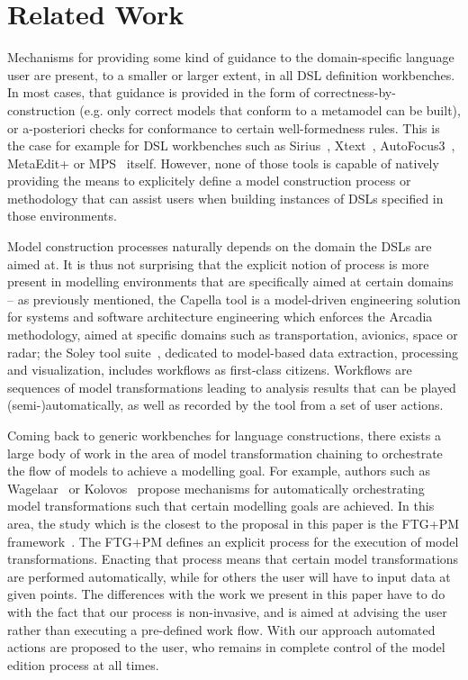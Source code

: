 \section{Related Work}
\label{sec:related_work}
 \vspace{-.3cm}
Mechanisms for providing some kind of guidance to the domain-specific
language user are present, to a smaller or larger extent, in all DSL definition
workbenches. In most cases, that guidance is provided in the form of
correctness-by-construction (e.g. only correct models that conform to a
metamodel can be built), or a-posteriori checks for conformance to certain
well-formedness rules. This is the case for example for DSL workbenches such as
Sirius~\cite{DBLP:conf/asplos/HauswaldLZLRKDM15},
Xtext~\cite{DBLP:conf/oopsla/EysholdtB10}, AutoFocus3~\cite{AF315},
MetaEdit+\cite{DBLP:conf/sle/Tolvanen16} or MPS~\cite{DBLP:conf/pppj/PechSV13}
itself. However, none of those tools is capable of natively providing the means
to explicitely define a model construction process or methodology that can
assist users when building instances of DSLs specified in those environments.

Model construction processes naturally depends on the domain the DSLs are aimed
at. It is thus not surprising that the explicit notion of process is more
present in modelling environments that are specifically aimed at certain domains
-- as previously mentioned, the Capella tool is a model-driven engineering
solution for systems and software architecture engineering which enforces the
Arcadia~\cite{DBLP:conf/syscon/BonnetVEN16} methodology, aimed at specific
domains such as transportation, avionics, space or radar; the Soley tool
suite~\cite{soley}, dedicated to model-based data extraction, processing and
visualization, includes workflows as first-class citizens.
Workflows are sequences of model transformations leading to analysis results
that can be played (semi-)automatically, as well as recorded by the tool from a
set of user actions.

Coming back to generic workbenches for language constructions, there exists a
large body of work in the area of model transformation chaining to orchestrate
the flow of models to achieve a modelling goal. For example, authors such as
Wagelaar~\cite{wagelaar2006blackbox}  or Kolovos~\cite{Kolovos2008} propose
mechanisms for automatically orchestrating model transformations such that
certain modelling goals are achieved. In this area, the study which is the
closest to the proposal in this paper is the FTG+PM
framework~\cite{DBLP:conf/sdl/LucioMDVJ13,MustafizDLV12}. The FTG+PM defines an
explicit process for the execution of model transformations.
Enacting that process means that certain model transformations are performed
automatically, while for others the user will have to input data at given
points. The differences with the work we present in this paper have to do with
the fact that our process is non-invasive, and is aimed at advising the user
rather than executing a pre-defined work flow. With our approach automated
actions are proposed to the user, who remains in complete control of the model
edition process at all times.

